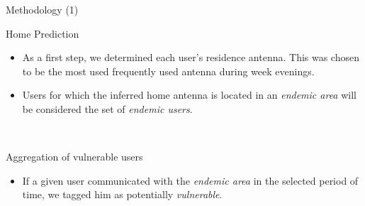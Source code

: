 \documentclass{beamer}
\begin{document}


\begin{frame}{Methodology (1)}

	\begin{block}{Home Prediction}
		\begin{itemize}
			\item As a first step, we determined each user's residence antenna. This was chosen to be the most used frequently used antenna during week evenings.



			\item Users for which the inferred home antenna is located in an \textit{endemic area} will
			be considered the set of \textit{endemic users}.

		\end{itemize}
	\end{block}
	\pause\
	\begin{block}{Aggregation of vulnerable users}
		\begin{itemize}

			\item If a given user communicated with the \textit{endemic area} in the selected period of time, we tagged him as potentially \textit{vulnerable}.


\end{itemize}
\end{block}
\end{frame}
\end{document}
